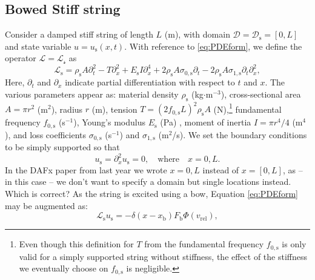 \documentclass[dvipsnames, pdftex]{article}
\def\SBcomment[#1]{\textcolor{Red}{#1}}
\def\SWcomment[#1]{\textcolor{Bittersweet}{#1}}
\def\MDcomment[#1]{\textcolor{Blue}{#1}}
\begin{document}
\subsection{Bowed Stiff string}
Consider a damped stiff string of length $L$ (m), with domain $\mathcal{D} = \mathcal{D}_\text{s} = [0,L]$ and state variable $u = u_\text{s}(x,t)$.  %
With reference to \eqref{eq:PDEform}, we define the operator $\mathcal{L} = \mathcal{L_\text{s}}$ as
\begin{equation}
    \mathcal{L}_\text{s} = \rho_\text{s} A \partial_t^2 - T\partial_x^2 + E_\text{s}I\partial_x^4+2\rho_\text{s} A\sigma_{0,\text{s}}\partial_t-2\rho_\text{s} A\sigma_{1,\text{s}}\partial_t\partial_x^2,
\end{equation}
Here, $\partial_{t}$ and $\partial_{x}$ indicate partial differentiation with respect to $t$ and $x$. The various parameters appear as: material density $\rho_\text{s}$ (kg$\cdot$m$^{-3}$), cross-sectional area $A = \pi r^2$ (m$^2$), radius $r$ (m), tension $T = (2f_{0,\text{s}}L)^2\rho_\text{s}A$ (N),\footnote{Even though this definition for $T$ from the fundamental frequency $f_{0,\text{s}}$ is only valid for a simply supported string without stiffness, the effect of the stiffness we eventually choose on $f_{0,\text{s}}$ is negligible.} %
fundamental frequency $f_{0,\text{s}}$ (s$^{-1}$), Young's modulus $E_\text{s}$ (Pa) , moment of inertia $I=\pi r^4 / 4$ (m$^4$), and loss coefficients $\sigma_{0,\text{s}}$ (s$^{-1}$) and $\sigma_{1,\text{s}}$ (m$^2$/s). We set the boundary conditions to be simply supported so that
\begin{equation}\label{boundary}
    u_\text{s} = \partial_x^2u_\text{s} = 0, \quad \text{where} \quad x = 0, L.
\end{equation}
\SWcomment[In the DAFx paper from last year we wrote $x = 0, L$ instead of $x = {[}0, L{]}$, as -- in this case -- we don't want to specify a domain but single locations instead. Which is correct?]
As the string is excited using a bow, Equation \eqref{eq:PDEform} may be augmented as:
\begin{equation}\label{eq:bowedString}
    \mathcal{L}_\text{s}u_\text{s} = -\delta(x-x_\text{b})F_\text{b}\Phi(v_\text{rel}),
\end{equation}
\end{document}
